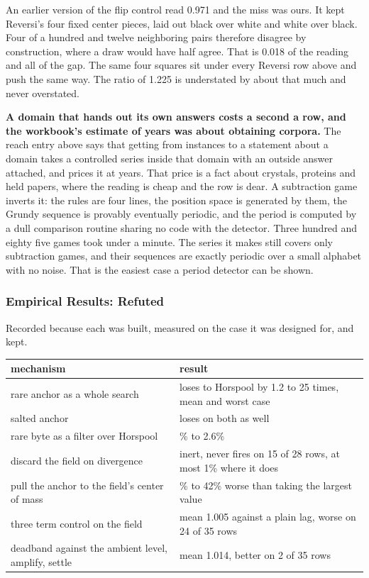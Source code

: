 An earlier version of the flip control read 0.971 and the miss was ours. It kept Reversi's four fixed center pieces, laid out black over white and white over black. Four of a hundred and twelve neighboring pairs therefore disagree by construction, where a draw would have half agree. That is 0.018 of the reading and all of the gap. The same four squares sit under every Reversi row above and push the same way. The ratio of 1.225 is understated by about that much and never overstated.

\textbf{A domain that hands out its own answers costs a second a row, and the workbook's estimate of years was about obtaining corpora.} The reach entry above says that getting from instances to a statement about a domain takes a controlled series inside that domain with an outside answer attached, and prices it at years. That price is a fact about crystals, proteins and held papers, where the reading is cheap and the row is dear. A subtraction game inverts it: the rules are four lines, the position space is generated by them, the Grundy sequence is provably eventually periodic, and the period is computed by a dull comparison routine sharing no code with the detector. Three hundred and eighty five games took under a minute. The series it makes still covers only subtraction games, and their sequences are exactly periodic over a small alphabet with no noise. That is the easiest case a period detector can be shown.

\subsubsection{Empirical Results: Refuted}

Recorded because each was built, measured on the case it was designed for, and kept.

\tiny
\setlength{\tabcolsep}{2pt}
\begin{longtable}{@{}>{\raggedright\arraybackslash}p{}>{\raggedright\arraybackslash}p{}@{}}
\toprule
mechanism & result \\
\midrule
rare anchor as a whole search & loses to Horspool by 1.2 to 25 times, mean and worst case \\
salted anchor & loses on both as well \\
rare byte as a filter over Horspool & 0.0\% to 2.6\% \\
discard the field on divergence & inert, never fires on 15 of 28 rows, at most 1\% where it does \\
pull the anchor to the field's center of mass & 2\% to 42\% worse than taking the largest value \\
three term control on the field & mean 1.005 against a plain lag, worse on 24 of 35 rows \\
deadband against the ambient level, amplify, settle & mean 1.014, better on 2 of 35 rows \\
\bottomrule
\end{longtable}
\normalsize

